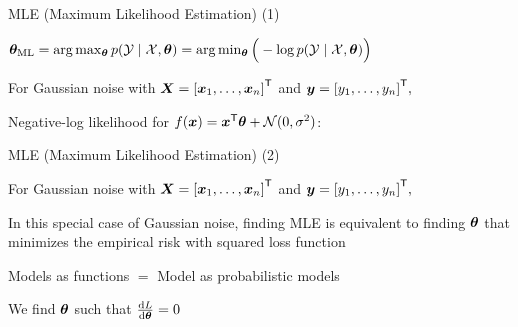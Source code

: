 \documentclass[handout,fleqn,aspectratio=169]{beamer}
\begin{document}
\begin{frame}{MLE (Maximum Likelihood Estimation) (1)}

\plitemsep 0.1in

\bci 

\item $\bm{\theta}_{\text{ML}} = \arg \max_{\bm{\theta}} p({\cal Y} \mid {\cal X}, \bm{\theta}) = \arg \min_{\bm{\theta}} \Big( -\log p({\cal Y} \mid {\cal X}, \bm{\theta}) \Big)$ 
\item For Gaussian noise with $\bm{X} = {[\bm{x}_1, \ldots, \bm{x}_n]}^{\mathsf{T}}$ and $\bm{y} = {[y_1, \ldots, y_n]}^{\mathsf{T}},$

\mycolorbox
{
Negative-log likelihood for $f(\bm{x}) = {\bm{x}}^{\mathsf{T}}\bm{\theta} + \mathcal N(0,\sigma^2)$:
\vspace{-0.1cm}
}
\eci
\end{frame}


\begin{frame}{MLE (Maximum Likelihood Estimation) (2)}

\plitemsep 0.05in

\bci 

\item For Gaussian noise with $\bm{X} = {[\bm{x}_1, \ldots, \bm{x}_n]}^{\mathsf{T}}$ and $\bm{y} = {[y_1, \ldots, y_n]}^{\mathsf{T}},$

\item In this special case of Gaussian noise, finding MLE is equivalent to finding $\bm{\theta}$ that minimizes the empirical risk with squared loss function
\bci
\item Models as functions $=$ Model as probabilistic models
\eci

\item We find $\bm{\theta}$ such that $\frac{\text{d} L}{\text{d} \bm{\theta}}=0$ 

\eci
\end{frame}
\end{document}
